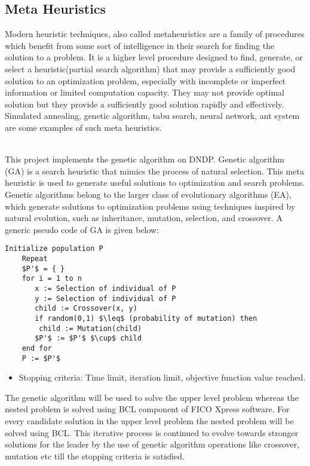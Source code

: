 \documentclass{article}
\begin{document}
\subsection{Meta Heuristics}
Modern heuristic techniques, also called metaheuristics are a family of procedures which benefit from some sort of intelligence in their search for finding the solution to a problem. It is a higher level procedure designed to find, generate, or select a heuristic(partial search algorithm) that may provide a sufficiently good solution to an optimization problem, especially with incomplete or imperfect information or limited computation capacity. They may not provide optimal solution but they provide a sufficiently good solution rapidly and effectively. Simulated annealing, genetic algorithm, tabu search, neural network, ant system are some examples of such meta heuristics.\par
\noindent
\\This project implements the genetic algorithm on DNDP. Genetic algorithm (GA) is a search heuristic that mimics the process of natural selection. This meta heuristic is used to generate useful solutions to optimization and search problems. Genetic algorithms belong to the larger class of evolutionary algorithms (EA), which generate solutions to optimization problems using techniques inspired by natural evolution, such as inheritance, mutation, selection, and crossover. A generic pseudo code of GA is given below:
\begin{lstlisting}[mathescape]
	Initialize population P
	Repeat
	$P'$ = { }
	for i = 1 to n
	   x := Selection of individual of P
	   y := Selection of individual of P
	   child := Crossover(x, y)
	   if random(0,1) $\leq$ (probability of mutation) then
	   	child := Mutation(child)
	   $P'$ := $P'$ $\cup$ child
	end for
	P := $P'$
\end{lstlisting}
\begin{itemize}
\item Stopping criteria: Time limit, iteration limit, objective function value reached.
\end{itemize}
The genetic algorithm will be used to solve the upper level problem whereas the nested problem is solved using BCL component of FICO Xpress software. For every candidate solution in the upper level problem the nested problem will be solved using BCL. This iterative process is continued to evolve towards stronger solutions for the leader by the use of genetic algorithm operations like crossover, mutation etc till the stopping criteria is satisfied.
\end{document}
